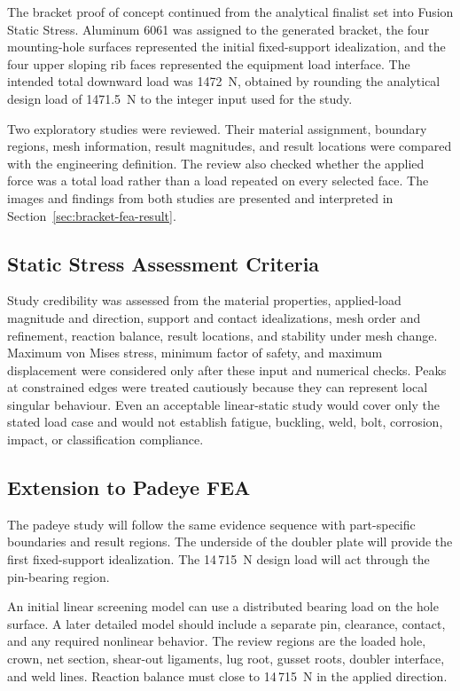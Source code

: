 The bracket proof of concept continued from the analytical finalist set into
Fusion Static Stress. Aluminum 6061 was assigned to the generated bracket, the
four mounting-hole surfaces represented the initial fixed-support
idealization, and the four upper sloping rib faces represented the equipment
load interface. The intended total downward load was 1472~N, obtained by
rounding the analytical design load of 1471.5~N to the integer input used for
the study.

Two exploratory studies were reviewed. Their material assignment, boundary
regions, mesh information, result magnitudes, and result locations were
compared with the engineering definition. The review also checked whether the
applied force was a total load rather than a load repeated on every selected
face. The images and findings from both studies are presented and interpreted
in Section~\ref{sec:bracket-fea-result}.

\subsection{Static Stress Assessment Criteria}
\label{sec:fea-quality-procedure}

Study credibility was assessed from the material properties, applied-load
magnitude and direction, support and contact idealizations, mesh order and
refinement, reaction balance, result locations, and stability under mesh
change. Maximum von Mises stress, minimum factor of safety, and maximum
displacement were considered only after these input and numerical checks.
Peaks at constrained edges were treated cautiously because they can represent
local singular behaviour. Even an acceptable linear-static study would cover
only the stated load case and would not establish fatigue, buckling, weld,
bolt, corrosion, impact, or classification compliance.

\subsection{Extension to Padeye FEA}
\label{sec:padeye-fea-method}

The padeye study will follow the same evidence sequence with part-specific
boundaries and result regions. The underside of the doubler plate will provide
the first fixed-support idealization. The 14\,715~N design load will act
through the pin-bearing region.

An initial linear screening model can use a distributed bearing load on the
hole surface. A later detailed model should include a separate pin, clearance,
contact, and any required nonlinear behavior. The review regions are the
loaded hole, crown, net section, shear-out ligaments, lug root, gusset roots,
doubler interface, and weld lines. Reaction balance must close to
14\,715~N in the applied direction.


